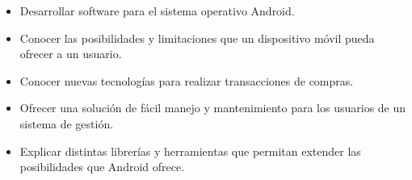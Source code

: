 \begin{itemize}
	\item Desarrollar software para el sistema operativo Android.
	\item Conocer las posibilidades y limitaciones que un dispositivo m\'ovil pueda ofrecer a un usuario.
	\item Conocer nuevas tecnolog\'ias para realizar transacciones de compras.
	\item Ofrecer una soluci\'on de f\'acil manejo y mantenimiento para los usuarios de un sistema de gesti\'on.
	\item Explicar distintas librer\'ias y herramientas que permitan extender las posibilidades que Android ofrece. 
\end{itemize}



